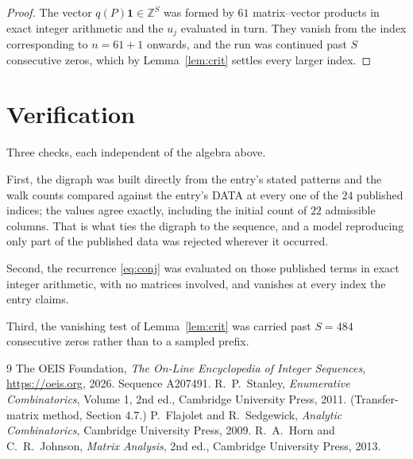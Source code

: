 \documentclass[11pt,a4paper]{article}
\theoremstyle{plain}
\theoremstyle{definition}
\begin{document}
\begin{proof}
The vector $q(P)\mathbf{1}\in\mathbb{Z}^{S}$ was formed by $61$ matrix--vector
products in exact integer arithmetic and the $u_j$ evaluated in turn. They vanish from the
index corresponding to $n=61+1$ onwards, and the run was continued past $S$ consecutive
zeros, which by Lemma~\ref{lem:crit} settles every larger index.
\end{proof}

\section{Verification}

Three checks, each independent of the algebra above.

First, the digraph was built directly from the entry's stated patterns and the walk counts
compared against the entry's DATA at every one of the $24$ published indices; the
values agree exactly, including the initial count of $22$ admissible columns. That is
what ties the digraph to the sequence, and a model reproducing only part of the published
data was rejected wherever it occurred.

Second, the recurrence \eqref{eq:conj} was evaluated on those published terms in exact
integer arithmetic, with no matrices involved, and vanishes at every index the entry claims.

Third, the vanishing test of Lemma~\ref{lem:crit} was carried past $S=484$ consecutive
zeros rather than to a sampled prefix.

\begin{thebibliography}{9}
 The OEIS Foundation, \emph{The On-Line Encyclopedia of Integer
Sequences}, \url{https://oeis.org}, 2026. Sequence A207491.
 R.~P.~Stanley, \emph{Enumerative Combinatorics}, Volume 1, 2nd ed.,
Cambridge University Press, 2011. (Transfer-matrix method, Section 4.7.)
 P.~Flajolet and R.~Sedgewick, \emph{Analytic Combinatorics}, Cambridge
University Press, 2009.
 R.~A.~Horn and C.~R.~Johnson, \emph{Matrix Analysis}, 2nd ed., Cambridge
University Press, 2013.
\end{thebibliography}
\end{document}
